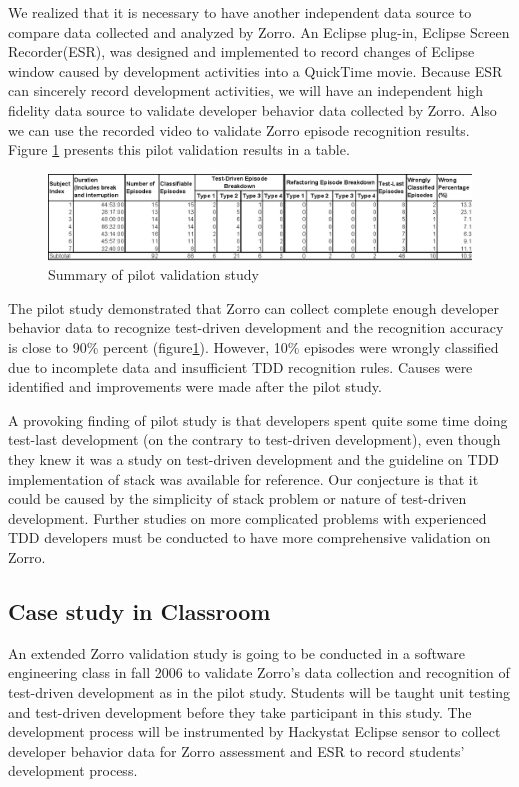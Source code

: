 We realized that it is necessary to have another independent data source to
compare data collected and analyzed by Zorro. An Eclipse plug-in, Eclipse
Screen Recorder(ESR), was designed and implemented to record changes of
Eclipse window caused by development activities into a QuickTime
movie\cite{csdl2-06-02}. Because ESR can sincerely record development
activities, we will have an independent high fidelity data source to
validate developer behavior data collected by Zorro. Also we can use the
recorded video to validate Zorro episode recognition results. Figure
\ref{fig:PilotSummary} presents this pilot validation results in a table.
\begin{figure}[htbp] 
  \centering
  \includegraphics{figs/Pilot-Summary.eps}
  \caption{Summary of pilot validation study}\label{fig:PilotSummary}
\end{figure}
 
The pilot study demonstrated that Zorro can collect complete enough
developer behavior data to recognize test-driven development and the
recognition accuracy is close to 90\% percent
(figure\ref{fig:PilotSummary}). However, 10\% episodes were wrongly
classified due to incomplete data and insufficient TDD recognition rules.
Causes were identified and improvements were made after the pilot study.

A provoking finding of pilot study is that developers spent quite some time
doing test-last development (on the contrary to test-driven development),
even though they knew it was a study on test-driven development and the
guideline on TDD implementation of stack was available for reference. Our
conjecture is that it could be caused by the simplicity of stack problem or
nature of test-driven development. Further studies on more complicated
problems with experienced TDD developers must be conducted to have more
comprehensive validation on Zorro.

\subsection{Case study in Classroom}
An extended Zorro validation study is going to be conducted in a software
engineering class in fall 2006 to validate Zorro's data collection and
recognition of test-driven development as in the pilot study. Students will
be taught unit testing and test-driven development before they take
participant in this study. The development process will be instrumented by
Hackystat Eclipse sensor to collect developer behavior data for Zorro
assessment and ESR to record students' development process.

